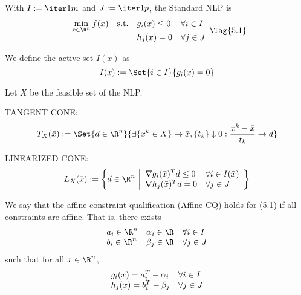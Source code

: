 


With $I:=\iter1m$ and $J:=\iter1p$, the Standard NLP is
\begin{equation*}
  \begin{array}{l l l l}
    \displaystyle \min_{x\in\R^n}f(x)
     & \text{s.t.} & g_i(x)\leq0 & \forall i\in I \\
     &             & h_j(x)=0    & \forall j\in J
  \end{array}\Tag{5.1}
\end{equation*}

We define the active set $I(\bar x)$ as
$$
  I(\bar x):=\Set{i\in I}{g_i(\bar x)=0}
$$

Let $X$ be the feasible set of the NLP.

TANGENT CONE:
$$
  T_X(\bar x):=
  \Set{d\in\R^n}{\exists \{x^k\in X\}\to\bar x,\{t_k\}\downarrow0:\frac{x^k-\bar x}{t_k}\to d}
$$

LINEARIZED CONE:
$$
  L_X(\bar x):=\left\{ d\in\R^n\ \middle\vert
  \begin{array}{l l}
    \nabla g_i(\bar x)^Td\leq0 & \forall i\in I(\bar x) \\
    \nabla h_j(\bar x)^Td=0    & \forall j\in J
  \end{array}
  \right\}
$$

\label{e55c332}

We say that the affine constraint qualification (Affine CQ) holds for (5.1) if
all constraints are affine. That is, there exists
$$
  \begin{array}{l l l}
    a_i\in\R^n & \alpha_i\in\R & \forall i\in I \\
    b_i\in\R^n & \beta_j\in\R  & \forall j\in J
  \end{array}
$$
such that for all $x\in\R^n$,
$$
  \begin{array}{l l}
    g_i(x)=a_i^T-\alpha_i & \forall i\in I \\
    h_j(x)=b_i^T-\beta_j  & \forall j\in J
  \end{array}
$$


